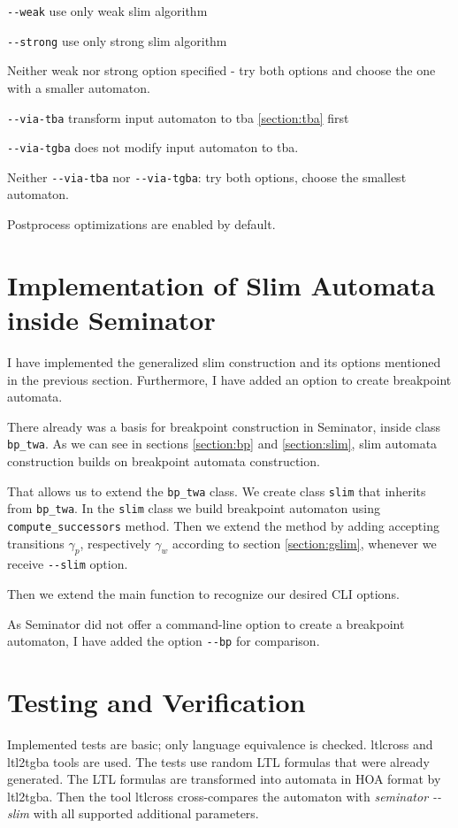 \documentclass[
	digital,
nolof, nolot
]{fithesis3}
\begin{document}
		\texttt{-{}-weak} use only weak slim algorithm
		
		\texttt{-{}-strong} use only strong slim algorithm
		
		Neither weak nor strong option specified - try both options  and choose the one with a smaller automaton.
		
		\texttt{-{}-via-tba} transform input automaton to tba \ref{section:tba} first
		
		\texttt{-{}-via-tgba} does not modify input automaton to tba.
		
		Neither \texttt{-{}-via-tba} nor \texttt{-{}-via-tgba}: try both options, choose the smallest automaton.
		
		Postprocess optimizations are enabled by default.
		
		
	\section{Implementation of Slim Automata inside Seminator}
	I have implemented the generalized slim construction and its options mentioned in the previous section. Furthermore, I have added an option to create breakpoint automata.
	
	There already was a basis for breakpoint construction in Seminator, inside class \texttt{bp\_twa}.
	As we can see in sections \ref{section:bp} and \ref{section:slim}, slim automata construction builds on breakpoint automata construction.
	
	That allows us to extend the \texttt{bp\_twa} class.
	We create class \texttt{slim} that inherits from \texttt{bp\_twa}.
	In the \texttt{slim} class we build breakpoint automaton using \texttt{compute\_successors} method.
	Then we extend the method by adding accepting transitions $\gamma_p$, respectively $\gamma_w$ according to section \ref{section:gslim}, whenever we receive \texttt{-{}-slim} option.
	
	Then we extend the main function to recognize our desired CLI options.
	
	As Seminator did not offer a command-line option to create a breakpoint automaton, I have added the option \texttt{-{}-bp} for comparison.
	
	
	
	\section{Testing and Verification}
	Implemented tests are basic; only language equivalence is checked.
	ltlcross and ltl2tgba tools are used. The tests use random LTL formulas that were already generated. The LTL formulas are transformed into automata in HOA format by ltl2tgba.
	Then the tool ltlcross cross-compares the automaton with \emph{seminator -{}-slim} with all supported additional parameters.
	
\end{document}
